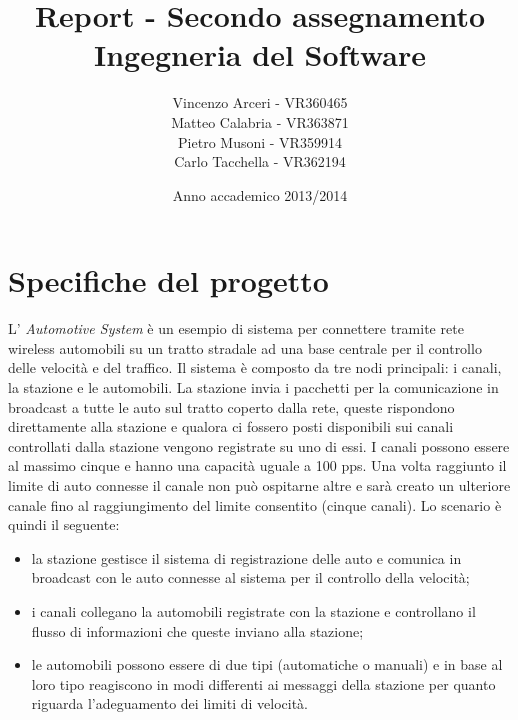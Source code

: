 \documentclass[a4paper,10pt]{article}
\begin{document}
\title{Report - Secondo assegnamento Ingegneria del Software}
\author{Vincenzo Arceri - VR360465\\
 Matteo Calabria - VR363871\\
 Pietro Musoni - VR359914\\ 
Carlo Tacchella - VR362194\\}
\date{Anno accademico 2013/2014}
\maketitle

\section{Specifiche del progetto}

L' \textit{Automotive System} è un esempio di sistema per connettere tramite rete wireless automobili su un tratto stradale ad una base centrale per il controllo delle velocità e del traffico. Il sistema è composto da tre nodi principali: i canali, la stazione e le automobili. La stazione invia i pacchetti per la comunicazione in broadcast a tutte le auto sul tratto coperto dalla rete, queste rispondono direttamente alla stazione e qualora ci fossero posti disponibili sui canali controllati dalla stazione vengono registrate su uno di essi. I canali possono essere al massimo cinque e hanno una capacità uguale a 100 pps. Una volta raggiunto il limite di auto connesse il canale non può ospitarne altre e sarà creato un ulteriore canale fino al raggiungimento del limite consentito (cinque canali).   
Lo scenario è quindi il seguente:
\begin{itemize}
\item la stazione gestisce il sistema di registrazione delle auto e comunica in broadcast con le auto connesse al sistema per il controllo della velocità;
\item i canali collegano la automobili registrate con la stazione e controllano il flusso di informazioni che queste inviano alla stazione;
\item le automobili possono essere di due tipi (automatiche o manuali) e in base al loro tipo reagiscono in modi differenti ai messaggi della stazione per quanto riguarda l'adeguamento dei limiti di velocità. 
\end{itemize}
\end{document}
